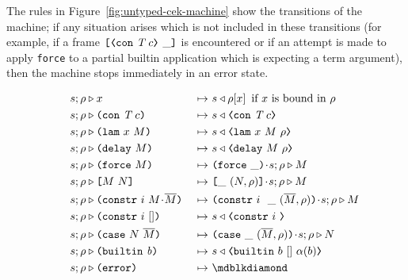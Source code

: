 The rules in Figure~\ref{fig:untyped-cek-machine} show the transitions of the
machine; if any situation arises which is not included in these transitions (for
example, if a frame $\inAppRightFrame{\VCon{\tn}{c}}$ is encountered or if an
attempt is made to apply \texttt{force} to a partial builtin application which
is expecting a term argument), then the machine stops immediately in an error
state.


\begin{figure}[H]
  \begin{subfigure}[c]{\linewidth}

    \begin{minipage}{\linewidth}
\begin{alignat*}{2}
 s;\rho & \compute x                                 &~\mapsto~& s \return  \rho[x] \enskip \text{if $x$ is bound in $\rho$}\\
 s;\rho & \compute \con{\tn}{c}                       &~\mapsto~& s \return \VCon{\tn}{c}\\
 s;\rho & \compute \lamU{x}{M}                       &~\mapsto~& s \return \VLamAbs{x}{M}{\rho}\\
 s;\rho & \compute \delay{M}                         &~\mapsto~& s\return \VDelay{M}{\rho}\\
 s;\rho & \compute \force{M}                         &~\mapsto~& \inForceFrame{} \cons s;\rho \compute M \\
 s;\rho & \compute \appU{M}{N}                       &~\mapsto~& \inAppLeftFrame{(N,\rho)} \cons s ;\rho \compute M\\
 s;\rho & \compute \constr{i}{M \cons \repetition{M}} &~\mapsto~& \inConstrFrame{i}{}{(\repetition{M},\rho)} \cons s ;\rho \compute M\\
 s;\rho & \compute \constr{i}{[]} &~\mapsto~&  s \return \VConstr{i}{}\\
 s;\rho & \compute \kase{N}{\repetition{M}} &~\mapsto~&  \inCaseFrame{(\repetition{M},\rho)} \cons s ;\rho \compute N\\
 s;\rho & \compute \builtin{b}                      &~\mapsto~& s \return \VBuiltin{b}{[]}{\arity{b}}\\
 s;\rho & \compute \errorU                           &~\mapsto~& \cekerror{}\\
\\[-10pt] %

\end{alignat*}
\end{minipage}
\end{subfigure}
\end{figure}
